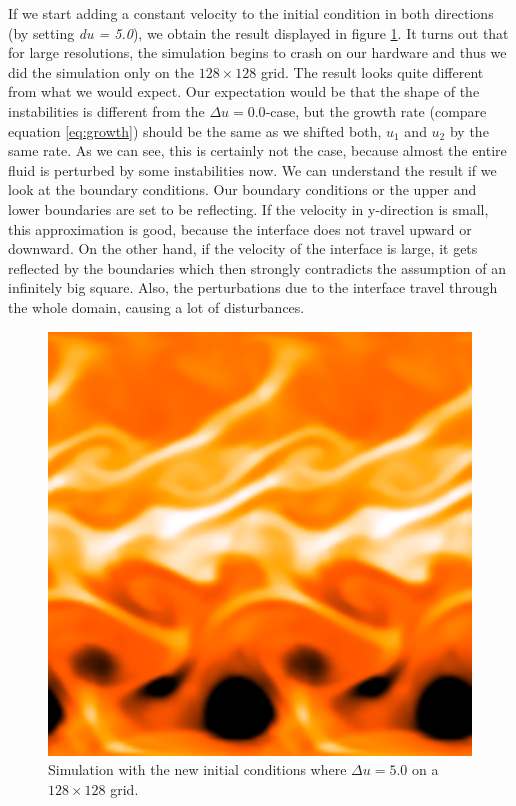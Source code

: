 \documentclass{scrartcl}
\begin{document}
If we start adding a constant velocity to the initial condition in both directions (by setting \textit{du = 5.0}), we obtain the result displayed in figure \ref{fig:galileiinvarianceresize}.
It turns out that for large resolutions, the simulation begins to crash on our hardware and thus we did the simulation only on the \( 128 \times 128 \) grid.
The result looks quite different from what we would expect.
Our expectation would be that the shape of the instabilities is different from the \( \Delta u = 0.0 \)-case, but  the growth rate (compare equation \ref{eq:growth}) should be the same as we shifted both, \( u_1 \) and \( u_2 \) by the same rate.
As we can see, this is certainly not the case, because almost the entire fluid is perturbed by some instabilities now.
We can understand the result if we look at the boundary conditions. 
Our boundary conditions or the upper and lower boundaries are set to be reflecting.
If the velocity in y-direction is small, this approximation is good, because the interface does not travel  upward or downward. 
On the other hand, if the velocity of the interface is large, it gets reflected by the boundaries which then strongly contradicts the assumption of an infinitely big square.
Also, the perturbations due to the interface travel through the whole domain, causing a lot of disturbances.

\begin{figure}
	\centering
	\includegraphics[width=0.7\linewidth]{../Galilei_Invariance_resize}
	\caption{Simulation with the new initial conditions where \( \Delta u = 5.0 \) on a \( 128 \times 128 \) grid.}
	\label{fig:galileiinvarianceresize}
\end{figure}
\end{document}

